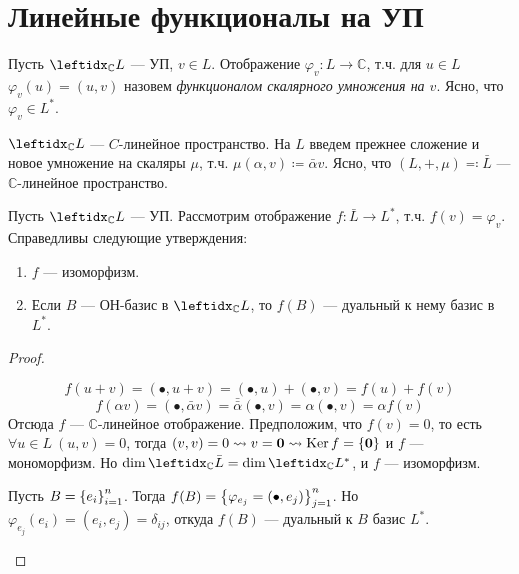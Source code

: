 \section{Линейные функционалы на УП}

\begin{defn}
    Пусть $\lsub{\mathbb{C}}{L}$ --- УП, $v \in L$. Отображение $\varphi_v \colon L \to \mathbb{C}$, т.ч. для $u \in L$ $\varphi_v(u) = (u, v)$ назовем \textit{функционалом скалярного умножения на $v$}. Ясно, что $\varphi_v \in L^*$.
\end{defn}

\begin{defn}
    $\lsub{\mathbb{C}}{L}$ --- $C$-линейное пространство. На $L$ введем прежнее сложение и новое умножение на скаляры $\mu$, т.ч. $\mu(\alpha, v) \coloneqq \bar{\alpha} v$. Ясно, что $(L, +, \mu) \eqqcolon \bar{L}$ --- $\mathbb{C}$-линейное пространство.
\end{defn}

\begin{thm*}
    Пусть $\lsub{\mathbb{C}}{L}$ --- УП. Рассмотрим отображение $f \colon \bar{L} \to L^*$, т.ч. $f(v) = \varphi_v$. Справедливы следующие утверждения:
    \begin{enumerate}
        \item $f$ --- изоморфизм.
        \item Если $B$ --- ОН-базис в $\lsub{\mathbb{C}}{L}$, то $f(B)$ --- дуальный к нему базис в $L^*$.
    \end{enumerate}
\end{thm*}

\begin{proof}
    \begin{proofpart}
        $$f(u + v) = (\bullet, u + v) = (\bullet, u) + (\bullet, v) = f(u) + f(v)$$
        $$f(\alpha v) = (\bullet, \bar{\alpha}v) = \bar{\bar{\alpha}}(\bullet, v) = \alpha(\bullet, v) = \alpha f(v)$$
        Отсюда $f$ --- $\mathbb{C}$-линейное отображение. Предположим, что $f(v) = 0$, то есть $\forall u \in L\ (u, v) = 0$, тогда $(v, v) = 0 \leadsto v = \mathbf{0} \leadsto \operatorname{Ker} f = \{\mathbf{0}\}$ и $f$ --- мономорфизм. Но $\dim \lsub{\mathbb{C}}{\bar{L}} = \dim \lsub{\mathbb{C}}{L^*}$, и $f$ --- изоморфизм.
    \end{proofpart}
    \begin{proofpart}
        Пусть $B = \left\{e_i\right\}_{i=1}^{n}$. Тогда $f(B) = \left\{\varphi_{e_j} = (\bullet, e_j)\right\}_{j=1}^{n}$. Но $\varphi_{e_j}(e_i) = (e_i, e_j) = \delta_{ij}$, откуда $f(B)$ --- дуальный к $B$ базис $L^*$.
    \end{proofpart}
\end{proof}